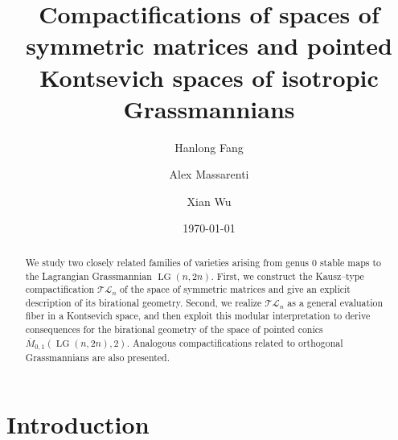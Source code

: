 \documentclass[10pt]{amsart}
\theoremstyle{definition}
\newcommand{\LG}{\operatorname{LG}}
\newcommand{\TL}{\mathcal{TL}}
\theoremstyle{plain} %
\begin{document}
\title
[Compactifications of spaces of symmetric matrices and pointed Kontsevich spaces]
{Compactifications of spaces of symmetric matrices and pointed Kontsevich spaces of isotropic Grassmannians}

\author[Hanlong Fang]{Hanlong Fang}
\address{{\sc Hanlong Fang}\\ School of Mathematical Sciences, Peking University, Beijing 100871, China}

\author[Alex Massarenti]{Alex Massarenti}
\address{\sc Alex Massarenti\\ Department of Mathematics and Computer Science, University of Ferrara, Via Machiavelli 30, 44121 Ferrara, Italy}

\author[Xian Wu]{Xian Wu}
\address{{\sc Xian Wu}\\ School of Mathematical Sciences, Peking University, Beijing 100871, China}

\date{\today}

\begin{abstract}
We study two closely related families of varieties arising from genus $0$ stable maps to the Lagrangian Grassmannian $\LG(n,2n)$. First, we construct the Kausz--type compactification $\TL_n$ of the space of symmetric matrices and give an explicit description of its birational geometry. Second, we realize $\TL_n$ as a general evaluation fiber in a Kontsevich space, and then exploit this modular interpretation to derive consequences for the birational geometry of the space of pointed conics $\overline{M}_{0,1}(\LG(n,2n),2)$. Analogous compactifications related to orthogonal Grassmannians are also presented.
\end{abstract}

\maketitle
\setcounter{tocdepth}{1}
\tableofcontents




\maketitle
\setcounter{tocdepth}{1}
\tableofcontents

\section*{Introduction}
\end{document}
